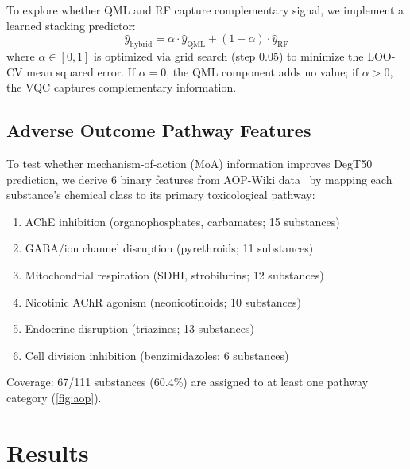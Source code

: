 \documentclass[12pt,a4paper]{article}
\newcommand{\degtl}{DegT50}
\newcommand{\loocv}{LOO-CV}
\newcommand{\nsub}{111}
\begin{document}
To explore whether QML and RF capture complementary signal, we implement
a learned stacking predictor:
\begin{equation}
  \hat{y}_\text{hybrid} = \alpha \cdot \hat{y}_\text{QML} +
                           (1 - \alpha) \cdot \hat{y}_\text{RF}
\end{equation}
where $\alpha \in [0, 1]$ is optimized via grid search (step 0.05) to
minimize the \loocv{} mean squared error. If $\alpha = 0$, the QML
component adds no value; if $\alpha > 0$, the VQC captures complementary
information.


\subsection{Adverse Outcome Pathway Features}
\label{sec:aop}

To test whether mechanism-of-action (MoA) information improves \degtl{}
prediction, we derive 6 binary features from AOP-Wiki
data~\citep{aopwiki2024, villeneuve2014} by mapping each substance's
chemical class to its primary toxicological pathway:

\begin{enumerate}[nosep]
  \item AChE inhibition (organophosphates, carbamates; 15 substances)
  \item GABA/ion channel disruption (pyrethroids; 11 substances)
  \item Mitochondrial respiration (SDHI, strobilurins; 12 substances)
  \item Nicotinic AChR agonism (neonicotinoids; 10 substances)
  \item Endocrine disruption (triazines; 13 substances)
  \item Cell division inhibition (benzimidazoles; 6 substances)
\end{enumerate}

Coverage: 67/\nsub{} substances (60.4\%) are assigned to at least one
pathway category (\cref{fig:aop}).


\section{Results}
\label{sec:results}

\end{document}
